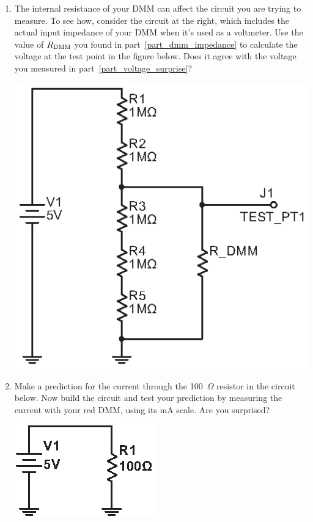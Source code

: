 \begin{enumerate}[wide]
\item The internal resistance of your DMM can affect the circuit you are trying to measure.  To see how, consider the circuit at the right, which includes the actual input impedance of your DMM when it's used as a voltmeter.  Use the value of $R_{\rm DMM}$ you found in part~\ref{part_dmm_impedance} to calculate the voltage at the test point in the figure below.  Does it agree with the voltage you measured in part~\ref{part_voltage_surprise}?

\begin{center}
\includegraphics{input_output_impedance/input_impedance2.eps}
\end{center}

\item Make a prediction for the current through the 100~$\Omega$ resistor in the circuit below.  Now build the circuit and test your prediction by measuring the current with your red DMM, using its mA scale.  Are you surprised? \label{part_current_surprise}
 
\begin{center}
\includegraphics{input_output_impedance/current_measurement.eps}
\end{center}


\end{enumerate}

